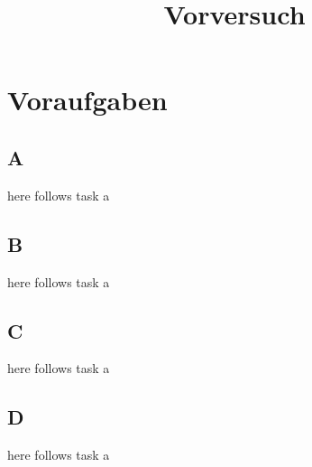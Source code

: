 

\title{Vorversuch}


\maketitle
\tableofcontents

\disclaimer

\chapter{Voraufgaben}
\section*{A}
here follows task a
\section*{B}
here follows task a
\section*{C}
here follows task a
\section*{D}
here follows task a

